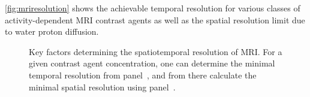 \autoref{fig:mriresolution} shows the achievable temporal resolution for various classes of activity-dependent MRI contrast agents as well as the spatial resolution limit due to water proton diffusion.

\begin{figure}[htbp]
\caption{Key factors determining the spatiotemporal resolution of MRI. For a given contrast agent concentration, one can determine the minimal temporal resolution from panel~\protect{}, and from there calculate the minimal spatial resolution using panel~\protect{}.}
\label{fig:mriresolution}
\centering
{}
\hspace{1mm}
\end{figure}

